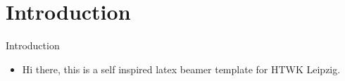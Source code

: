 \section{Introduction}
\begin{frame}{Introduction}
\begin{itemize}
    \item Hi there, this is a self inspired latex beamer template for HTWK Leipzig.
\end{itemize}
\end{frame}
